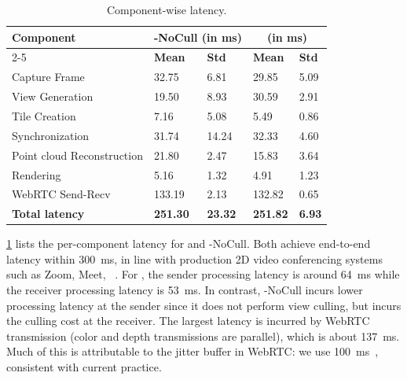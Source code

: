 \begin{table}[t]
\centering
    {
	\begin{tabular}{|l|l|l|l|l|}
		\hline
		\multicolumn{1}{|l|}{\multirow{2}{*}{\textbf{Component}}} & \multicolumn{2}{c|}{\textbf{\livo-NoCull (in ms)}} & \multicolumn{2}{c|}{\textbf{\livo (in ms)}} \\ \cline{2-5} 
		\multicolumn{1}{|l|}{} & \multicolumn{1}{l|}{\textbf{Mean}} & \multicolumn{1}{l|}{\textbf{Std}} & \multicolumn{1}{l|}{\textbf{Mean}} & \multicolumn{1}{l|}{\textbf{Std}} \\ \hline
		Capture Frame 						& 32.75 & 6.81  & 29.85 	& 5.09 \\ \hline
		View Generation 					& 19.50 & 8.93 & 30.59 	& 2.91 \\ \hline
		Tile Creation 						& 7.16 & 5.08 & 5.49  	& 0.86 \\ \hline
		Synchronization						& 31.74 & 14.24 & 32.33	& 4.60 \\ \hline
            Point cloud Reconstruction & 21.80 & 2.47 & 15.83 	& 3.64 \\ \hline
		Rendering 							& 5.16 & 1.32 & 4.91  	& 1.23 \\ \hline
		WebRTC Send-Recv 					& 133.19 & 2.13 & 132.82	& 0.65 \\ \hline
		\textbf{Total latency} 				& \textbf{251.30} & \textbf{23.32} & \textbf{251.82} & \textbf{6.93} \\ \hline
	\end{tabular}
    }
	\caption{Component-wise latency.} %
	\label{tab:latency}
\end{table}

\cref{tab:latency} lists the per-component latency for \livo and \livo-NoCull.
%
Both achieve end-to-end latency within 300~ms, in line with production 2D video conferencing systems such as Zoom, Meet, \etc~\cite{videoconf-benchmark, salsify}.
%
For \livo, the sender processing latency is around 64~ms while the receiver processing latency is 53~ms.
%
In contrast, \livo-NoCull incurs lower processing latency at the sender since it does not perform view culling, but incurs the culling cost at the receiver.
%
The largest latency is incurred by WebRTC transmission (color and depth transmissions are parallel), which is about 137~ms.
%
Much of this is attributable to the jitter buffer in WebRTC: we use 100~ms~\cite{jitterbuffer-imc2023}, consistent with current practice.
%
%
%

